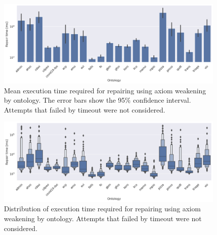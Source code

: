 \begin{figure}[ht]
  \begin{widepage}
    \centering
    \includegraphics[width=\textwidth]{resources/time-ontology-bar.png}
  \end{widepage}
  \caption{Mean execution time required for repairing using axiom weakening by ontology. The error bars show the 95\% confidence interval. Attempts that failed by timeout were not considered.}
\end{figure}

\begin{figure}[ht]
  \begin{widepage}
    \centering
    \includegraphics[width=\textwidth]{resources/time-ontology-violin.png}
  \end{widepage}
  \caption{Distribution of execution time required for repairing using axiom weakening by ontology. Attempts that failed by timeout were not considered.}
\end{figure}

